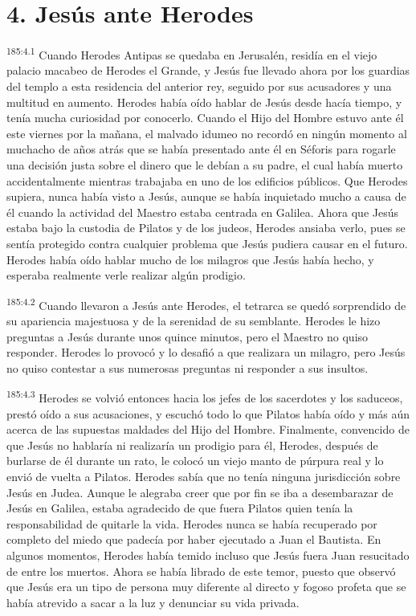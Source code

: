 \section*{4. Jesús ante Herodes}
\par 
\textsuperscript{185:4.1} Cuando Herodes Antipas se quedaba en Jerusalén, residía en el viejo palacio macabeo de Herodes el Grande, y Jesús fue llevado ahora por los guardias del templo a esta residencia del anterior rey, seguido por sus acusadores y una multitud en aumento. Herodes había oído hablar de Jesús desde hacía tiempo, y tenía mucha curiosidad por conocerlo. Cuando el Hijo del Hombre estuvo ante él este viernes por la mañana, el malvado idumeo no recordó en ningún momento al muchacho de años atrás que se había presentado ante él en Séforis para rogarle una decisión justa sobre el dinero que le debían a su padre, el cual había muerto accidentalmente mientras trabajaba en uno de los edificios públicos. Que Herodes supiera, nunca había visto a Jesús, aunque se había inquietado mucho a causa de él cuando la actividad del Maestro estaba centrada en Galilea. Ahora que Jesús estaba bajo la custodia de Pilatos y de los judeos, Herodes ansiaba verlo, pues se sentía protegido contra cualquier problema que Jesús pudiera causar en el futuro. Herodes había oído hablar mucho de los milagros que Jesús había hecho, y esperaba realmente verle realizar algún prodigio.

\par 
\textsuperscript{185:4.2} Cuando llevaron a Jesús ante Herodes, el tetrarca se quedó sorprendido de su apariencia majestuosa y de la serenidad de su semblante. Herodes le hizo preguntas a Jesús durante unos quince minutos, pero el Maestro no quiso responder. Herodes lo provocó y lo desafió a que realizara un milagro, pero Jesús no quiso contestar a sus numerosas preguntas ni responder a sus insultos.

\par 
\textsuperscript{185:4.3} Herodes se volvió entonces hacia los jefes de los sacerdotes y los saduceos, prestó oído a sus acusaciones, y escuchó todo lo que Pilatos había oído y más aún acerca de las supuestas maldades del Hijo del Hombre. Finalmente, convencido de que Jesús no hablaría ni realizaría un prodigio para él, Herodes, después de burlarse de él durante un rato, le colocó un viejo manto de púrpura real y lo envió de vuelta a Pilatos. Herodes sabía que no tenía ninguna jurisdicción sobre Jesús en Judea. Aunque le alegraba creer que por fin se iba a desembarazar de Jesús en Galilea, estaba agradecido de que fuera Pilatos quien tenía la responsabilidad de quitarle la vida. Herodes nunca se había recuperado por completo del miedo que padecía por haber ejecutado a Juan el Bautista. En algunos momentos, Herodes había temido incluso que Jesús fuera Juan resucitado de entre los muertos. Ahora se había librado de este temor, puesto que observó que Jesús era un tipo de persona muy diferente al directo y fogoso profeta que se había atrevido a sacar a la luz y denunciar su vida privada.

